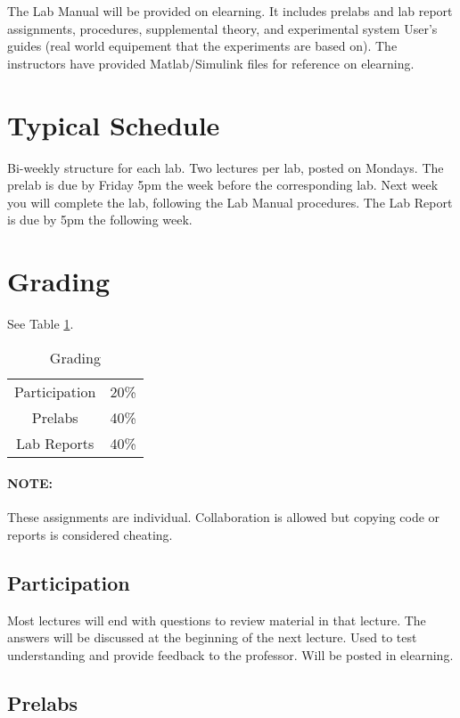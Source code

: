\documentclass[12pt, a4paper]{report}
\begin{document}
  The Lab Manual will be provided on elearning. It includes prelabs and lab report assignments, procedures, supplemental theory, and experimental system User's guides (real world equipement that the experiments are based on). The instructors have provided Matlab/Simulink files for reference on elearning.

  \section{Typical Schedule}

  Bi-weekly structure for each lab. Two lectures per lab, posted on Mondays. The prelab is due by Friday 5pm the week before the corresponding lab. Next week you will complete the lab, following the Lab Manual procedures. The Lab Report is due by 5pm the following week.

  \section{Grading}

  See Table \ref{tab:table1}.

  \begin{table}
    \centering
    \caption{Grading}
    \label{tab:table1}
    \begin{tabular}{c c}
      Participation & 20\% \\
      Prelabs & 40\% \\
      Lab Reports & 40\%
    \end{tabular}
  \end{table}

  \paragraph{NOTE:} These assignments are individual. Collaboration is allowed but copying code or reports is considered cheating.

  \subsection{Participation}

  Most lectures will end with questions to review material in that lecture. The answers will be discussed at the beginning of the next lecture. Used to test understanding and provide feedback to the professor. Will be posted in elearning.

  \subsection{Prelabs}
\end{document}
